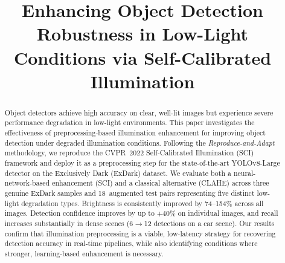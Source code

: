 \documentclass[conference]{IEEEtran}
\begin{document}
\title{Enhancing Object Detection Robustness in Low-Light Conditions via
Self-Calibrated Illumination}

\author{
  \and
  \and
}

\maketitle

\begin{abstract}
Object detectors achieve high accuracy on clear, well-lit images but
experience severe performance degradation in low-light environments.
This paper investigates the effectiveness of preprocessing-based
illumination enhancement for improving object detection under degraded
illumination conditions. Following the \emph{Reproduce-and-Adapt}
methodology, we reproduce the CVPR~2022 Self-Calibrated Illumination
(SCI) framework and deploy it as a preprocessing step for the
state-of-the-art YOLOv8-Large detector on the Exclusively Dark (ExDark)
dataset. We evaluate both a neural-network-based enhancement (SCI) and a
classical alternative (CLAHE) across three genuine ExDark samples and
18~augmented test pairs representing five distinct low-light degradation
types. Brightness is consistently improved by 74--154\% across all
images. Detection confidence improves by up to $+40\%$ on individual
images, and recall increases substantially in dense scenes (6$\to$12
detections on a car scene). Our results confirm that illumination
preprocessing is a viable, low-latency strategy for recovering detection
accuracy in real-time pipelines, while also identifying conditions where
stronger, learning-based enhancement is necessary.
\end{abstract}
\end{document}
